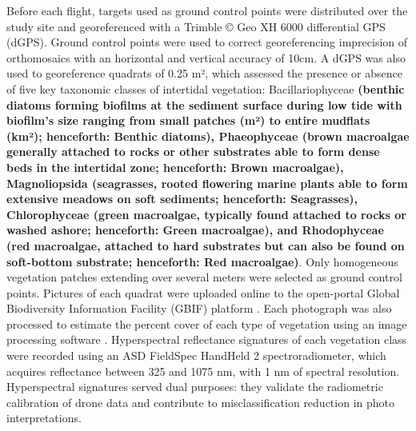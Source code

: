 \documentclass[
  number]{elsarticle}
\begin{document}
Before each flight, targets used as ground control points were
distributed over the study site and georeferenced with a Trimble © Geo
XH 6000 differential GPS (dGPS). Ground control points were used to
correct georeferencing imprecision of orthomosaics with an horizontal
and vertical accuracy of 10cm. A dGPS was also used to georeference
quadrats of 0.25 m², which assessed the presence or absence of five key
taxonomic classes of intertidal vegetation: Bacillariophyceae
\textbf{(benthic diatoms forming biofilms at the sediment surface during
low tide with biofilm's size ranging from small patches (m²) to entire
mudflats (km²); henceforth: Benthic diatoms), Phaeophyceae (brown
macroalgae generally attached to rocks or other substrates able to form
dense beds in the intertidal zone; henceforth: Brown macroalgae),
Magnoliopsida (seagrasses, rooted flowering marine plants able to form
extensive meadows on soft sediments; henceforth: Seagrasses),
Chlorophyceae (green macroalgae, typically found attached to rocks or
washed ashore; henceforth: Green macroalgae), and Rhodophyceae (red
macroalgae, attached to hard substrates but can also be found on
soft-bottom substrate; henceforth: Red macroalgae)}. Only homogeneous
vegetation patches extending over several meters were selected as ground
control points. Pictures of each quadrat were uploaded online to the
open-portal Global Biodiversity Information Facility (GBIF) platform
\citep{BedeGbif}. Each photograph was also processed to estimate the
percent cover of each type of vegetation using an image processing
software \citep[ImageJ,][]{schneider2012nih}. Hyperspectral reflectance
signatures of each vegetation class were recorded using an ASD FieldSpec
HandHeld 2 spectroradiometer, which acquires reflectance between 325 and
1075 nm, with 1 nm of spectral resolution. Hyperspectral signatures
served dual purposes: they validate the radiometric calibration of drone
data and contribute to misclassification reduction in photo
interpretations.
\end{document}
